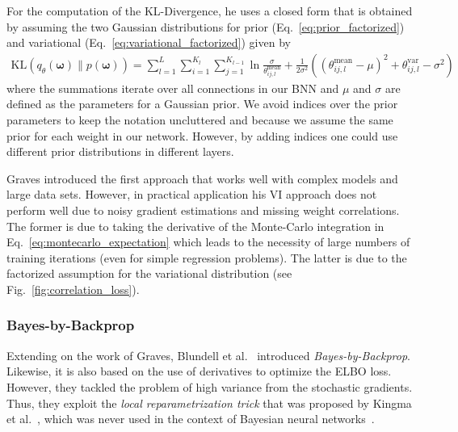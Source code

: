 \documentclass[runningheads]{llncs}
\begin{document}
For the computation of the KL-Divergence, he uses a closed form that is obtained by assuming the two Gaussian distributions for prior (Eq.~\ref{eq:prior_factorized}) and variational (Eq.~\ref{eq:variational_factorized}) given by
\begin{align}
\mathrm{KL}(q_\theta(\boldsymbol{\omega})\|p(\boldsymbol{\omega})) =
\sum_{l=1}^{L}\sum_{i=1}^{K_l}\sum_{j=1}^{K_{l-1}} \ln \frac{\sigma}{\theta^{\mathrm{mean}}_{ij,l}} + \frac{1}{2\sigma^2} \left(( \theta^{\mathrm{mean}}_{ij,l}-\mu )^2 + \theta^{\mathrm{var}}_{ij,l} - \sigma^2\right)
\end{align}
where the summations iterate over all connections in our BNN and $\mu$ and $\sigma$ are defined as the parameters for a Gaussian prior.
We avoid indices over the prior parameters to keep the notation uncluttered and because we assume the same prior for each weight in our network.
However, by adding indices one could use different prior distributions in different layers.

Graves introduced the first approach that works well with complex models and large data sets.
However, in practical application his VI approach does not perform well due to noisy gradient estimations and missing weight correlations.
The former is due to taking the derivative of the Monte-Carlo integration in Eq.~\ref{eq:montecarlo_expectation} which leads to the necessity of large numbers of training iterations (even for simple regression problems). The latter is due to the factorized assumption for the variational distribution (see Fig.~\ref{fig:correlation_loss}).


\subsubsection{Bayes-by-Backprop}
\label{sec:bayes_by_backprop}
Extending on the work of Graves, Blundell et al.~\cite{BlundellBBB} introduced \textit{Bayes-by-Backprop}.
Likewise, it is also based on the use of derivatives to optimize the ELBO loss.
However, they tackled the problem of high variance from the stochastic gradients. 
Thus, they exploit the \textit{local reparametrization trick} that was proposed by Kingma et al.~\cite{Kingma:2015:VDL:2969442.2969527}, which was never used in the context of Bayesian neural networks~\cite{kingma2013autoencoding}.
\end{document}
